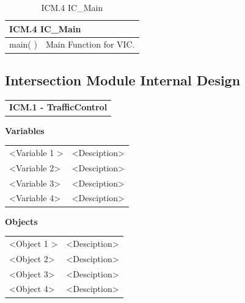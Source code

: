 \documentclass [10pt]{article}
\begin{document}
\begin{longtable}{| p{ } | p{ } | }\caption{ICM.4 IC\_Main} \\\hline  
 \multicolumn{2}{|l|}{\textbf {ICM.4 IC\_Main}}\\ \hline
 
\cellcolor{tableCell}main( ) & \cellcolor{tableCell}Main Function for VIC. \\ \hline 




\end{longtable}


\subsection{Intersection Module Internal Design}



\begin{longtable}{p{}}
\rowcolor{subsectionC}\textbf{ICM.1 - TrafficControl} \\
\end{longtable}

\textbf{Variables} 

\begin{longtable}{ p{ }  p{ }} \\ 

 
\rowcolor{tableCell} <Variable 1 >& <Desciption> \\ 
<Variable 2>& <Desciption> \\

\rowcolor{tableCell}<Variable 3> & <Desciption> \\ 
<Variable 4>& <Desciption> \\

\end{longtable}

\textbf{Objects} 
\begin{longtable}{ p{ }  p{ }} \\ 

 
\rowcolor{tableCell} <Object 1 >& <Desciption> \\ 
<Object 2>& <Desciption> \\

\rowcolor{tableCell}<Object 3> & <Desciption> \\ 
<Object 4>& <Desciption> \\

\end{longtable}
\end{document}
